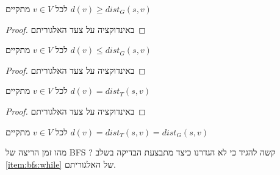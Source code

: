 \begin{claim}
לכל
$v \in V$
מתקיים
$d(v) \geq dist_G(s, v)$
\end{claim}
\begin{proof}
באינדוקציה על צעד האלגוריתם
\end{proof}

\begin{claim}
לכל
$v \in V$
מתקיים
$d(v) \leq dist_G(s,v)$
\end{claim}
\begin{proof}
באינדוקציה על צעד האלגוריתם
\end{proof}

\begin{claim}
לכל
$v \in V$
מתקיים
$d(v) = dist_T(s,v)$
\end{claim}
\begin{proof}
באינדוקציה על צעד האלגוריתם
\end{proof}


\begin{theorem}
לכל
$v \in V$
מתקיים
$d(v) = dist_T(s,v) = dist_G(s,v)$
\end{theorem}
מהו זמן הריצה של BFS ? קשה להגיד כי לא הגדרנו כיצד מתבצעת הבדיקה בשלב 
\ref{item:bfs:while}
של האלגוריתם.
